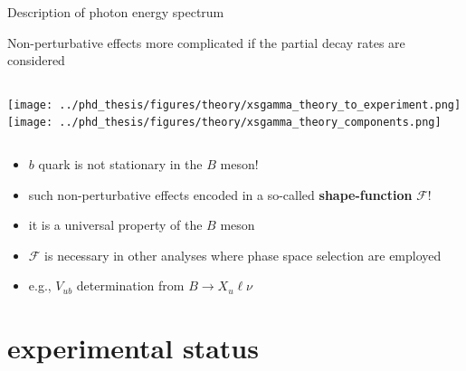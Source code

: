 \documentclass[xcolor=dvipsnames]{beamer}
\begin{document}
\begin{frame}{Description of \BtoXsgamma photon energy spectrum}

   \scriptsize\centering

   Non-perturbative effects more complicated if the partial decay rates are considered

   \vspace{10pt}

   \begin{columns}
      \centering
      \texttt{[image: ../phd\_thesis/figures/theory/xsgamma\_theory\_to\_experiment.png]}
      \centering
      \texttt{[image: ../phd\_thesis/figures/theory/xsgamma\_theory\_components.png]}
   \end{columns}

   \begin{itemize}
      \item $b$ quark is not stationary in the $B$ meson!
      \item such non-perturbative effects encoded in a so-called \textbf{shape-function} $\bm{\mathcal{F}}$!
      \item[\ra] it is a universal property of the $B$ meson
      \item[\ra] $\mathcal{F}$ is necessary in other analyses where phase space selection are employed
      \item[\ra] e.g., $V_{ub}$ determination from $B\to X_u\ell\nu$ 
   \end{itemize}
   
\end{frame}

   \section{\safeBtoXsdgamma experimental status}
\end{document}
